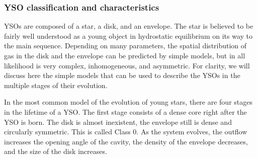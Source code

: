 




\subsubsection{YSO classification and characteristics}

YSOs are composed of a star, a disk, and an envelope. The star is believed to be fairly well understood as a young object in hydrostatic equilibrium on its way to the main sequence. Depending on many parameters, the spatial distribution of gas in the disk and the envelope can be predicted by simple models, but in all likelihood is very complex, inhomogeneous, and asymmetric. 
For clarity, we will discuss here the simple models that can be used to describe the YSOs in the multiple stages of their evolution.

In the most common model of the evolution of young stars, there are four stages in the lifetime of a YSO. The first stage consists of a dense core right after the YSO is born. The disk is almost inexistent, the envelope still is dense and circularly symmetric. This is called Class 0. As the system evolves, the outflow increases the opening angle of the cavity, the density of the envelope decreases, and the size of the disk increases.

